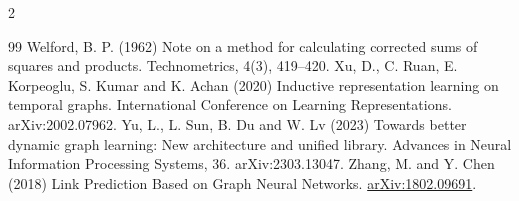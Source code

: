 \documentclass[a4paper,10pt,fleqn]{article}
\begin{document}
\begin{multicols}{2}
\begin{thebibliography}{99}
 Welford, B. P. (1962) Note on a method for calculating corrected sums of squares and products. Technometrics, 4(3), 419--420.
 Xu, D., C. Ruan, E. Korpeoglu, S. Kumar and K. Achan (2020) Inductive representation learning on temporal graphs. International Conference on Learning Representations. arXiv:2002.07962.
 Yu, L., L. Sun, B. Du and W. Lv (2023) Towards better dynamic graph learning: New architecture and unified library. Advances in Neural Information Processing Systems, 36. arXiv:2303.13047.
 Zhang, M. and Y. Chen (2018) Link Prediction Based on Graph Neural Networks. \href{https://arxiv.org/abs/1802.09691}{arXiv:1802.09691}.
\end{thebibliography}
\endgroup
\end{multicols}
\end{document}
